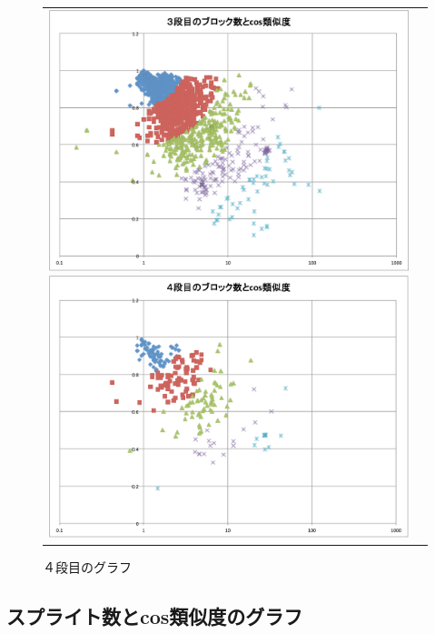 \documentclass[a4paper,10pt,onecolumn,oneside,openany]{jsbook}
\begin{document}
\begin{figure}[h]
\begin{tabular}{cc}
\begin{minipage}[t]{0.45\hsize}
	 \centering
	 \includegraphics[keepaspectratio, scale = 0.25]{graph_third_block.pdf}
	 \caption{３段目のグラフ}
	 \label{third_block}
	\end{minipage}
        \begin{minipage}[t]{0.45\hsize}
	 \centering
	 \includegraphics[keepaspectratio, scale = 0.25]{graph_fourth_block.pdf}
	 \caption{４段目のグラフ}
	 \label{fourth_block}
	\end{minipage}
 \end{tabular}
 \end{figure}
 
\subsection{スプライト数とcos類似度のグラフ}
\end{document}
